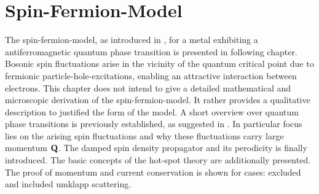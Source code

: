 %
%
%
\chapter{Spin-Fermion-Model}
\label{ch:spin fermion model}
%
%
%
The spin-fermion-model, as introduced in \cite{Abanov&Chubukov&Schmalian}, for a metal exhibiting a antiferromagnetic quantum phase transition is presented in following chapter.
Bosonic spin fluctuations arise in the vicinity of the quantum critical point due to fermionic particle-hole-excitations, enabling an attractive interaction between electrons.
This chapter does not intend to give a detailed mathematical and microscopic derivation of the spin-fermion-model.
It rather provides a qualitative description to justified the form of the model.
A short overview over quantum phase transitions is previously established, as suggested in \cite{SachdevQCP}.
In particular focus lies on the arising spin fluctuations and why these fluctuations carry large momentum $\vb{Q}$.
The damped spin density propagator and its perodicity is finally introduced.
The basic concepts of the hot-spot theory are additionally presented.
The proof of momentum and current conservation is shown for cases: excluded and included umklapp scattering.
%
%
